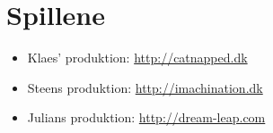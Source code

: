 
\chapter{Spillene}
\label{cha:spillene}

\begin{itemize}
\item Klaes' produktion: \url{http://catnapped.dk}
\item Steens produktion: \url{http://imachination.dk}
\item Julians produktion: \url{http://dream-leap.com}
\end{itemize}

